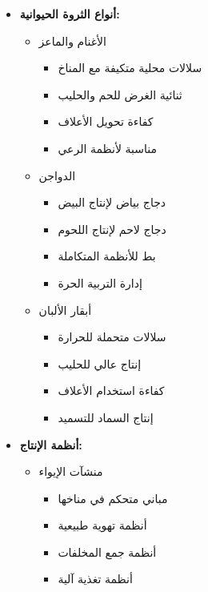 \begin{itemize}
    \item \textbf{أنواع الثروة الحيوانية:}
    \begin{itemize}
        \item الأغنام والماعز
        \begin{itemize}
            \item سلالات محلية متكيفة مع المناخ
            \item ثنائية الغرض للحم والحليب
            \item كفاءة تحويل الأعلاف
            \item مناسبة لأنظمة الرعي
        \end{itemize}
        
        \item الدواجن
        \begin{itemize}
            \item دجاج بياض لإنتاج البيض
            \item دجاج لاحم لإنتاج اللحوم
            \item بط للأنظمة المتكاملة
            \item إدارة التربية الحرة
        \end{itemize}
        
        \item أبقار الألبان
        \begin{itemize}
            \item سلالات متحملة للحرارة
            \item إنتاج عالي للحليب
            \item كفاءة استخدام الأعلاف
            \item إنتاج السماد للتسميد
        \end{itemize}
    \end{itemize}
    
    \item \textbf{أنظمة الإنتاج:}
    \begin{itemize}
        \item منشآت الإيواء
        \begin{itemize}
            \item مباني متحكم في مناخها
            \item أنظمة تهوية طبيعية
            \item أنظمة جمع المخلفات
            \item أنظمة تغذية آلية
        \end{itemize}
        

\end{itemize}
\end{itemize}

